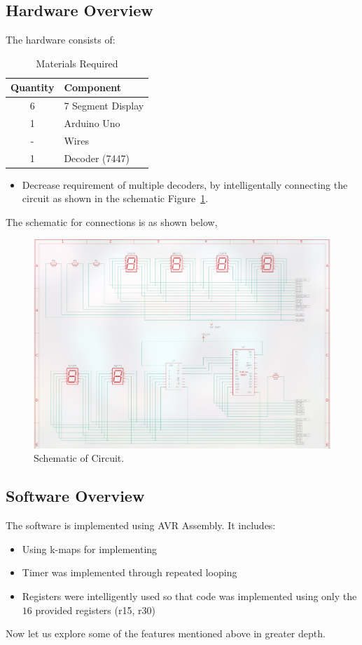 \documentclass[a4paper,12pt]{article}
\begin{document}
\subsection*{Hardware Overview}


The hardware consists of:
\begin{table}[H]
\centering
\begin{tabular}{|c|l|}
\hline
\textbf{Quantity} & \textbf{Component} \\
\hline
6 & 7 Segment Display \\
\hline
1 & Arduino Uno\\
\hline
- & Wires \\
\hline
1 & Decoder (7447) \\
\hline
\end{tabular}
\caption{Materials Required}
\label{tab:materials}
\end{table}

\begin{itemize}
    \item Decrease requirement of multiple decoders, by intelligentally connecting the circuit as shown in the schematic
    Figure~\ref{fig:circuit_schematic}.
\end{itemize}
The schematic for connections is as shown below,
\begin{figure}[H]
    \centering
    \includegraphics[width=\textwidth]{figs/circuit_schematic.png}
    \caption{Schematic of Circuit.}
    \label{fig:circuit_schematic}
\end{figure}
\subsection*{Software Overview}
The software is implemented using AVR Assembly. It includes:
\begin{itemize}
    \item Using k-maps for implementing
    \item Timer was implemented through repeated looping
    \item Registers were intelligently used so that code was implemented using only the $16$ provided registers (r15, r30)
\end{itemize}
Now let us explore some of the features mentioned above in greater depth.
\end{document}

